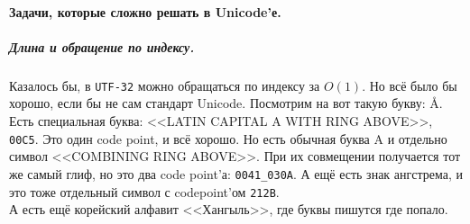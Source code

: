 \documentclass{article}
\begin{document}
    \paragraph{Задачи, которые сложно решать в Unicode'е.}
    \subparagraph{Длина и обращение по индексу.}
    Казалось бы, в \Verb|UTF-32| можно обращаться по индексу за $O(1)$. Но всё было бы хорошо, если бы не сам стандарт Unicode. Посмотрим на вот такую букву: \r{A}. Есть специальная буква: <<LATIN CAPITAL A WITH RING ABOVE>>, \Verb|00C5|. Это один code point, и всё хорошо. Но есть обычная буква A и отдельно символ <<COMBINING RING ABOVE>>. При их совмещении получается тот же самый глиф, но это два code point'а: \Verb|0041_030A|. А ещё есть знак ангстрема, и это тоже отдельный символ с codepoint'ом \Verb|212B|.\\
    А есть ещё корейский алфавит <<Хангыль>>, где буквы пишутся где попало.
\end{document}
